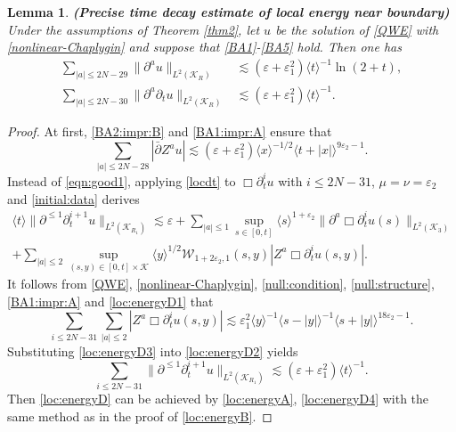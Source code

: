 \documentclass[11pt,twoside]{article}
\def\cK{\mathcal K}
\def\cW{\mathcal W}
\def\p{\partial}
\def\ve{\varepsilon}
\def\ls{\lesssim}
\newcommand{\w}[1]{\langle {#1} \rangle}
\theoremstyle{plain}
\newtheorem{lemma}[theorem]{Lemma}
\theoremstyle{definition}
\numberwithin{equation}{section}
\begin{document}
\begin{lemma}
{\bf (Precise time decay estimate of local energy near boundary)}
Under the assumptions of Theorem \ref{thm2}, let $u$ be the solution of \eqref{QWE} with \eqref{nonlinear-Chaplygin}
and suppose that \eqref{BA1}-\eqref{BA5} hold.
Then one has
\begin{equation}\label{loc:energyD}
\begin{split}
\sum_{|a|\le2N-29}\|\p^au\|_{L^2(\cK_R)}&\ls(\ve+\ve_1^2)\w{t}^{-1}\ln(2+t),\\
\sum_{|a|\le2N-30}\|\p^a\p_tu\|_{L^2(\cK_R)}&\ls(\ve+\ve_1^2)\w{t}^{-1}.
\end{split}
\end{equation}
\end{lemma}
\begin{proof}
At first, \eqref{BA2:impr:B} and \eqref{BA1:impr:A} ensure that
\begin{equation}\label{loc:energyD1}
\sum_{|a|\le2N-28}|\bar\p Z^au|\ls(\ve+\ve_1^2)\w{x}^{-1/2}\w{t+|x|}^{9\ve_2-1}.
\end{equation}
Instead of \eqref{eqn:good1}, applying \eqref{locdt} to $\Box\p_t^iu$ with $i\le2N-31$, $\mu=\nu=\ve_2$ and \eqref{initial:data} derives
\begin{equation}\label{loc:energyD2}
\begin{split}
\w{t}\|\p^{\le1}\p_t^{i+1}u\|_{L^2(\cK_{R_1})}\ls\ve+\sum_{|a|\le1}\sup_{s\in[0,t]}\w{s}^{1+\ve_2}\|\p^a\Box\p_t^iu(s)\|_{L^2(\cK_3)}\\
+\sum_{|a|\le2}\sup_{(s,y)\in[0,t]\times\cK}\w{y}^{1/2}\cW_{1+2\ve_2,1}(s,y)|Z^a\Box\p_t^iu(s,y)|.
\end{split}
\end{equation}
It follows from \eqref{QWE}, \eqref{nonlinear-Chaplygin}, \eqref{null:condition}, \eqref{null:structure}, \eqref{BA1:impr:A} and \eqref{loc:energyD1} that
\begin{equation}\label{loc:energyD3}
\sum_{i\le2N-31}\sum_{|a|\le2}|Z^a\Box\p_t^iu(s,y)|\ls\ve_1^2\w{y}^{-1}\w{s-|y|}^{-1}\w{s+|y|}^{18\ve_2-1}.
\end{equation}
Substituting \eqref{loc:energyD3} into \eqref{loc:energyD2} yields
\begin{equation}\label{loc:energyD4}
\sum_{i\le2N-31}\|\p^{\le1}\p_t^{i+1}u\|_{L^2(\cK_{R_1})}\ls(\ve+\ve_1^2)\w{t}^{-1}.
\end{equation}
Then \eqref{loc:energyD} can be achieved by \eqref{loc:energyA}, \eqref{loc:energyD4} with the same method as
in the proof of \eqref{loc:energyB}.
\end{proof}
\end{document}
